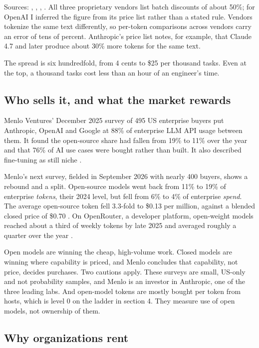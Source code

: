 Sources: \citet{anthropic2026pricing}, \citet{openai2026pricing}, \citet{google2026pricing}, \citet{deepinfra2026pricing}. All three proprietary vendors list batch discounts of about 50\%; for OpenAI I inferred the figure from its price list rather than a stated rule. Vendors tokenize the same text differently, so per-token comparisons across vendors carry an error of tens of percent. Anthropic's price list notes, for example, that Claude 4.7 and later produce about 30\% more tokens for the same text.

The spread is six hundredfold, from 4 cents to \$25 per thousand tasks. Even at the top, a thousand tasks cost less than an hour of an engineer's time.

\subsection{Who sells it, and what the market rewards}

 Menlo Ventures' December 2025 survey of 495 US enterprise buyers put Anthropic, OpenAI and Google at 88\% of enterprise LLM API usage between them. It found the open-source share had fallen from 19\% to 11\% over the year and that 76\% of AI use cases were bought rather than built. It also described fine-tuning as still niche \citep{menlo2025}.

Menlo's next survey, fielded in September 2026 with nearly 400 buyers, shows a rebound and a split. Open-source models went back from 11\% to 19\% of enterprise \emph{tokens}, their 2024 level, but fell from 6\% to 4\% of enterprise \emph{spend}. The average open-source token fell 3.3-fold to \$0.13 per million, against a blended closed price of \$0.70 \citep{menlo2026}. On OpenRouter, a developer platform, open-weight models reached about a third of weekly tokens by late 2025 and averaged roughly a quarter over the year \citep{aubakirova2026openrouter}.

Open models are winning the cheap, high-volume work. Closed models are winning where capability is priced, and Menlo concludes that capability, not price, decides purchases. Two cautions apply. These surveys are small, US-only and not probability samples, and Menlo is an investor in Anthropic, one of the three leading labs. And open-model tokens are mostly bought per token from hosts, which is level 0 on the ladder in section 4. They measure use of open models, not ownership of them.

\subsection{Why organizations rent}

